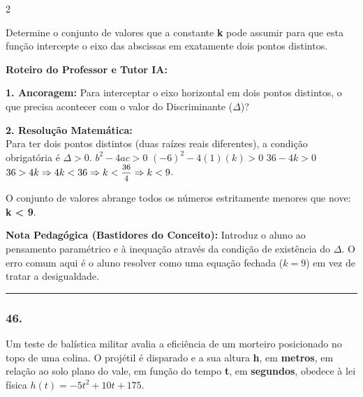 \begin{multicols*}{2}
\begin{enunciadoLiteral}
Determine o conjunto de valores que a constante \textbf{k} pode assumir para que esta função intercepte o eixo das abscissas em exatamente dois pontos distintos.
\end{enunciadoLiteral}

\ifgabarito
    \begin{tcolorbox}[colback=CorTitUm!5, colframe=CorTitUm, boxrule=1pt, arc=4pt, left=6pt, right=6pt, top=6pt, bottom=6pt]
    \small\textbf{\textcolor{CorTitUm}{Roteiro do Professor e Tutor IA:}}\par\vspace{0.1cm}
    \color{CinzaEscuro}
    \textbf{1. Ancoragem:} Para interceptar o eixo horizontal em dois pontos distintos, o que precisa acontecer com o valor do Discriminante ($\Delta$)?\par\vspace{0.1cm}
    \textbf{2. Resolução Matemática:}\\
    Para ter dois pontos distintos (duas raízes reais diferentes), a condição obrigatória é $\Delta > 0$.
    $b^2 - 4ac > 0$
    $(-6)^2 - 4(1)(k) > 0$
    $36 - 4k > 0$
    $36 > 4k \Rightarrow 4k < 36 \Rightarrow k < \mfrac{36}{4} \Rightarrow k < 9$.
    
    O conjunto de valores abrange todos os números estritamente menores que nove: \textbf{k < 9}.
    \end{tcolorbox}
    \vspace{0.15cm}
    
    \begin{boxexplicacao}
    \textbf{Nota Pedagógica (Bastidores do Conceito):} Introduz o aluno ao pensamento paramétrico e à inequação através da condição de existência do $\Delta$. O erro comum aqui é o aluno resolver como uma equação fechada ($k=9$) em vez de tratar a desigualdade.
    \end{boxexplicacao}
\fi

\par\vspace{\espacoQuestao}

\noindent\textcolor{CorLinha}{\rule{\linewidth}{0.5pt}} 
\par\vspace{\espacoPreQuestao}
\subsubsection*{46.} 
\begin{enunciadoLiteral}
Um teste de balística militar avalia a eficiência de um morteiro posicionado no topo de uma colina. O projétil é disparado e a sua altura \textbf{h}, em \textbf{metros}, em relação ao solo plano do vale, em função do tempo \textbf{t}, em \textbf{segundos}, obedece à lei física $h(t) = -5t^2 + 10t + 175$.


\end{enunciadoLiteral}
\end{multicols*}
